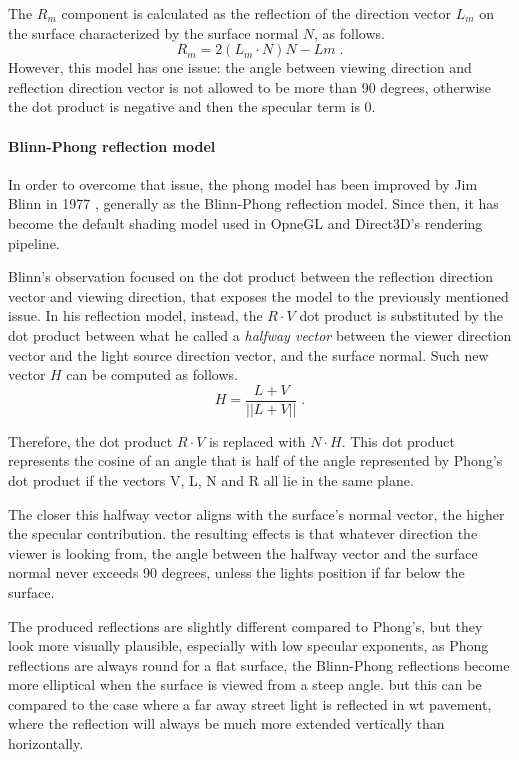 \documentclass[12pt,a4paper]{extarticle}
\newcommand{\linespace}{\vspace{8pt}}
\begin{document}
The $R_{m}$ component is calculated as the reflection of the direction vector $L_{m}$ on the surface characterized by the surface normal $N$, as follows.
\[
R_{m} = 2(L_{m} \cdot N)N - L{m} \;.
\]
However, this model has one issue: the angle between viewing direction and reflection direction vector  is not allowed to be more than 90 degrees, otherwise the dot product is negative and then the specular term is 0.
\paragraph{Blinn-Phong reflection model}
In order to overcome that issue, the phong model has been improved by Jim Blinn in 1977 \cite{blinn1977models}, generally as the Blinn-Phong reflection model. Since then, it has become the default shading model used in OpneGL and Direct3D's rendering pipeline. %


Blinn's observation focused on the dot product between the reflection direction vector and viewing direction, that exposes the model to the previously mentioned issue. In his reflection model, instead, the $R \cdot V$ dot product is substituted by the dot product between what he called a \textit{halfway vector} between the viewer direction vector and the light source direction vector, and the surface normal. Such new vector $H$ can be computed as follows.%
\[
H = \frac{L + V}{||L+V||} \;.
\]

Therefore, the dot product $R \cdot V$ is replaced with $N \cdot H$.
This dot product represents the cosine of an angle that is half of the angle represented by Phong's dot product if the vectors V, L, N and R all lie in the same plane.

The closer this halfway vector aligns with the surface's normal vector, the higher the specular contribution. the resulting effects is that whatever direction the viewer is looking from, the angle between the halfway vector and the surface normal never exceeds 90 degrees, unless the lights position if far below the surface.
\linespace

The produced reflections are slightly different compared to Phong's, but they look more visually plausible, especially with low specular exponents, as Phong reflections are always round for a flat surface, the Blinn-Phong reflections become more elliptical when the surface is viewed from a steep angle. but this can be compared to the case where a far away street light is reflected in wt pavement, where the reflection will always be much more extended vertically than horizontally.
\end{document}
